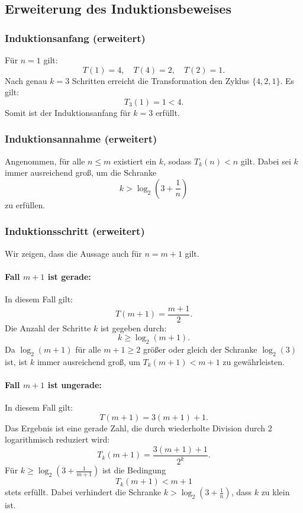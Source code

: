 \documentclass[a4paper,12pt]{article}
\begin{document}
\subsection{Erweiterung des Induktionsbeweises}
\subsubsection{Induktionsanfang (erweitert)}
Für \( n = 1 \) gilt:
\[
T(1) = 4, \quad T(4) = 2, \quad T(2) = 1.
\]
Nach genau \( k = 3 \) Schritten erreicht die Transformation den Zyklus \(\{4, 2, 1\}\). Es gilt:
\[
T_3(1) = 1 < 4.
\]
Somit ist der Induktionsanfang für \( k = 3 \) erfüllt.

\subsubsection{Induktionsannahme (erweitert)}
Angenommen, für alle \( n \leq m \) existiert ein \( k \), sodass \( T_k(n) < n \) gilt. Dabei sei \( k \) immer ausreichend groß, um die Schranke
\[
k > \log_2\left(3 + \frac{1}{n}\right)
\]
zu erfüllen.

\subsubsection{Induktionsschritt (erweitert)}
Wir zeigen, dass die Aussage auch für \( n = m + 1 \) gilt.

\paragraph{Fall \( m + 1 \) ist gerade:}
In diesem Fall gilt:
\[
T(m + 1) = \frac{m + 1}{2}.
\]
Die Anzahl der Schritte \( k \) ist gegeben durch:
\[
k \geq \log_2(m + 1).
\]
Da \(\log_2(m + 1)\) für alle \( m + 1 \geq 2 \) größer oder gleich der Schranke \(\log_2(3)\) ist, ist \( k \) immer ausreichend groß, um \( T_k(m + 1) < m + 1 \) zu gewährleisten.

\paragraph{Fall \( m + 1 \) ist ungerade:}
In diesem Fall gilt:
\[
T(m + 1) = 3(m + 1) + 1.
\]
Das Ergebnis ist eine gerade Zahl, die durch wiederholte Division durch 2 logarithmisch reduziert wird:
\[
T_k(m + 1) = \frac{3(m + 1) + 1}{2^k}.
\]
Für \( k \geq \log_2\left(3 + \frac{1}{m + 1}\right) \) ist die Bedingung
\[
T_k(m + 1) < m + 1
\]
stets erfüllt. Dabei verhindert die Schranke \( k > \log_2\left(3 + \frac{1}{n}\right) \), dass \( k \) zu klein ist.
\end{document}
